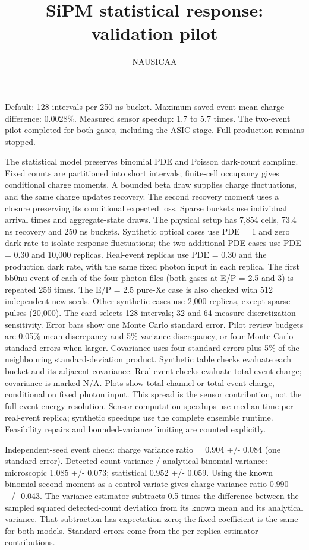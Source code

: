 \documentclass[10pt]{article}
\begin{document}
\title{SiPM statistical response: validation pilot}\author{NAUSICAA}\date{}\maketitle
Default: 128 intervals per 250 ns bucket. Maximum saved-event mean-charge difference: 0.0028\%. Measured sensor speedup: 1.7 to 5.7 times. The two-event pilot completed for both gases, including the ASIC stage. Full production remains stopped.

The statistical model preserves binomial PDE and Poisson dark-count sampling. Fixed counts are partitioned into short intervals; finite-cell occupancy gives conditional charge moments. A bounded beta draw supplies charge fluctuations, and the same charge updates recovery. The second recovery moment uses a closure preserving its conditional expected loss. Sparse buckets use individual arrival times and aggregate-state draws. The physical setup has 7,854 cells, 73.4 ns recovery and 250 ns buckets. Synthetic optical cases use PDE = 1 and zero dark rate to isolate response fluctuations; the two additional PDE cases use PDE = 0.30 and 10,000 replicas. Real-event replicas use PDE = 0.30 and the production dark rate, with the same fixed photon input in each replica. The first bb0nu event of each of the four photon files (both gases at E/P = 2.5 and 3) is repeated 256 times. The E/P = 2.5 pure-Xe case is also checked with 512 independent new seeds. Other synthetic cases use 2,000 replicas, except sparse pulses (20,000). The card selects 128 intervals; 32 and 64 measure discretization sensitivity. Error bars show one Monte Carlo standard error. Pilot review budgets are 0.05\% mean discrepancy and 5\% variance discrepancy, or four Monte Carlo standard errors when larger. Covariance uses four standard errors plus 5\% of the neighbouring standard-deviation product. Synthetic table checks evaluate each bucket and its adjacent covariance. Real-event checks evaluate total-event charge; covariance is marked N/A. Plots show total-channel or total-event charge, conditional on fixed photon input. This spread is the sensor contribution, not the full event energy resolution. Sensor-computation speedups use median time per real-event replica; synthetic speedups use the complete ensemble runtime. Feasibility repairs and bounded-variance limiting are counted explicitly.

Independent-seed event check: charge variance ratio = 0.904 +/- 0.084 (one standard error). Detected-count variance / analytical binomial variance: microscopic 1.085 +/- 0.073; statistical 0.952 +/- 0.059. Using the known binomial second moment as a control variate gives charge-variance ratio 0.990 +/- 0.043. The variance estimator subtracts 0.5 times the difference between the sampled squared detected-count deviation from its known mean and its analytical variance. That subtraction has expectation zero; the fixed coefficient is the same for both models. Standard errors come from the per-replica estimator contributions.
\end{document}
